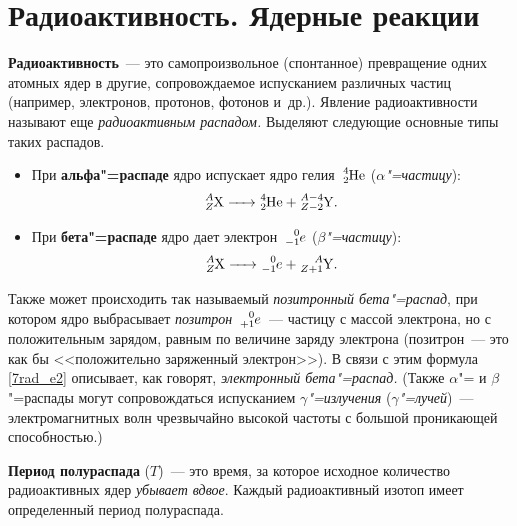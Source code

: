 \documentclass[main.tex]{subfiles}
\begin{document}

 

 

\setcounter{section}{21
}
\addtocounter{section}{-1} 

\section{Радиоактивность. Ядерные реакции}


\textbf{Радиоактивность}~--- это самопроизвольное (спонтанное) превращение одних атомных ядер в другие, сопровождаемое испусканием различных частиц (например, электронов, протонов, фотонов и~др.). 
Явление радиоактивности называют еще \emph{радиоактивным распадом.} Выделяют следующие основные типы таких распадов.
\begin{itemize}
    \item При \textbf{альфа"=распаде} ядро испускает ядро гелия~$\ce{^4_2He}$ (\emph{$\alpha$"=частицу}):
    \begin{equation}
        \label{7rad_e1}
        \ce{^$A$_$Z$X -> ^4_2He + ^{$A$-4}_{$Z$-2}Y}.
    \end{equation}
    \item При \textbf{бета"=распаде} ядро дает электрон~$\ce{^0_{-1}$e$}$ (\emph{$\beta$"=частицу}): 
    \begin{equation}
        \label{7rad_e2}
        \ce{^$A$_$Z$X -> ^0_{-1}$e$ + ^{$A$}_{$Z$+1}Y}.
    \end{equation}

\end{itemize}

Также может происходить так называемый \emph{позитронный бета"=распад}, при котором ядро выбрасывает \emph{позитрон}~$\ce{^0_{+1}$e$}$~--- частицу с массой электрона, но с положительным зарядом, равным по величине заряду электрона (позитрон~--- это как бы <<положительно заряженный электрон>>). В связи с этим формула \eqref{7rad_e2} описывает, как говорят, \emph{электронный бета"=распад.} (Также $\alpha$"= и $\beta$"=распады могут сопровождаться испусканием \emph{$\gamma$"=излучения} (\emph{$\gamma$"=лучей})~--- электромагнитных волн чрезвычайно высокой частоты с большой проникающей способностью.)

\textbf{Период полураспада} ($T$)~--- это время, за которое исходное количество радиоактивных ядер \emph{убывает вдвое}. Каждый радиоактивный изотоп имеет определенный период полураспада. 
\end{document}
